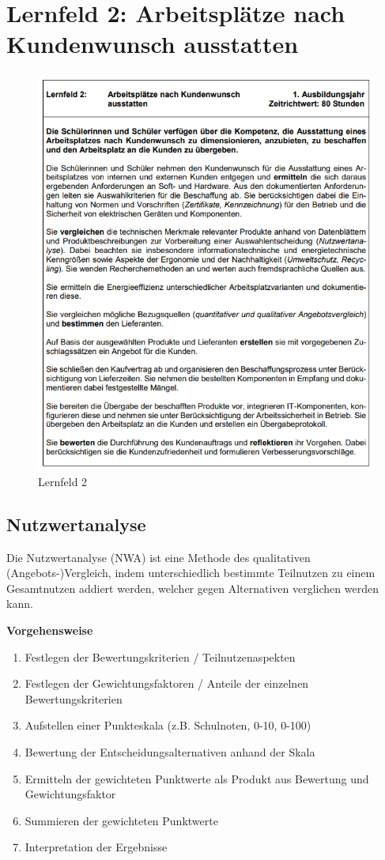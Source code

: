 \section{Lernfeld 2: Arbeitsplätze nach Kundenwunsch ausstatten}

\begin{figure}
    [H]
    \centering
    \includegraphics[width=\textwidth]{figures/lernfeld2.png}
    \caption{Lernfeld 2}
    \label{fig:lernfeld2}
\end{figure}

\subsection{Nutzwertanalyse}
Die Nutzwertanalyse (NWA) ist eine Methode des qualitativen (Angebots-)Vergleich, indem unterschiedlich bestimmte Teilnutzen zu einem Gesamtnutzen addiert werden, welcher gegen Alternativen verglichen werden kann.

\textbf{Vorgehensweise}

\begin{enumerate}
    \item Festlegen der Bewertungskriterien / Teilnutzenaspekten
    \item Festlegen der Gewichtungsfaktoren / Anteile der einzelnen Bewertungskriterien
    \item Aufstellen einer Punkteskala (z.B. Schulnoten, 0-10, 0-100)
    \item Bewertung der Entscheidungsalternativen anhand der Skala
    \item Ermitteln der gewichteten Punktwerte als Produkt aus Bewertung und Gewichtungsfaktor
    \item Summieren der gewichteten Punktwerte
    \item Interpretation der Ergebnisse
\end{enumerate}

